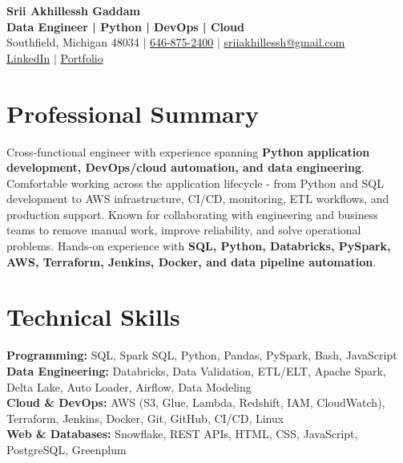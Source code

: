 \documentclass[letterpaper,10pt]{article}
\begin{document}
\fontsize{9.35pt}{10.45pt}\selectfont

\begin{center}
    {\LARGE \textbf{Srii Akhillessh Gaddam}} \\[-1pt]
    \textbf{Data Engineer | Python | DevOps | Cloud} \\[2pt]
    Southfield, Michigan 48034 $|$
    \href{tel:6468752400}{646-875-2400} $|$
    \href{mailto:sriiakhillessh@gmail.com}{sriiakhillessh@gmail.com} \\[1pt]
    \href{https://www.linkedin.com/in/srii-akhiilessh-gaddam-b48668191/}{LinkedIn} $|$
    \href{https://sriiakhillesshg.github.io/portfolio/}{Portfolio}
\end{center}
\vspace{-8pt}

\section{Professional Summary}
\small{Cross-functional engineer with experience spanning \textbf{Python application development, DevOps/cloud automation, and data engineering}. Comfortable working across the application lifecycle - from Python and SQL development to AWS infrastructure, CI/CD, monitoring, ETL workflows, and production support. Known for collaborating with engineering and business teams to remove manual work, improve reliability, and solve operational problems. Hands-on experience with \textbf{SQL, Python, Databricks, PySpark, AWS, Terraform, Jenkins, Docker, and data pipeline automation}.}

\section{Technical Skills}
\small{
\textbf{Programming:} SQL, Spark SQL, Python, Pandas, PySpark, Bash, JavaScript \\
\textbf{Data Engineering:} Databricks, Data Validation, ETL/ELT, Apache Spark, Delta Lake, Auto Loader, Airflow, Data Modeling \\
\textbf{Cloud \& DevOps:} AWS (S3, Glue, Lambda, Redshift, IAM, CloudWatch), Terraform, Jenkins, Docker, Git, GitHub, CI/CD, Linux \\
\textbf{Web \& Databases:} Snowflake, REST APIs, HTML, CSS, JavaScript, PostgreSQL, Greenplum
}

\end{document}
